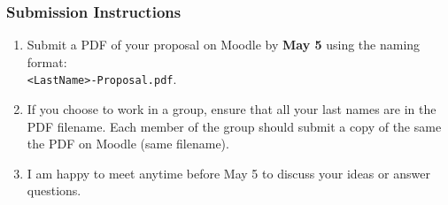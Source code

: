 \documentclass[11pt,twoside]{article}
\makeatletter
\newenvironment{exercise}{\@startsection 
	{section}
	{1}
	{-.2em}
	{-3.5ex plus -1ex minus -.2ex}
    	{1.3ex plus .2ex}
    	{\pagebreak[3]%
	\large\bf\noindent{Part 1.\hspace{-1.5ex} }
	}
	}
\newcommand{\?}{\stackrel{?}{=}}
\makeatother
\begin{document}


  


\subsubsection*{Submission Instructions}
\begin{enumerate}
\item Submit a PDF of your proposal on Moodle by \textbf{May 5} using the naming format:\\ \texttt{<LastName>-Proposal.pdf}.
\item If you choose to work in a group, ensure that all your last names are in the PDF filename. Each member of the group should  submit
  a copy of the same the PDF on  Moodle (same filename).  
\item I am happy to meet anytime before May 5 to discuss your ideas or answer questions. 
\end{enumerate}
 
\end{document}
